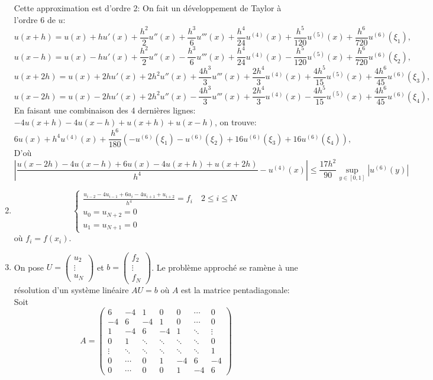 \documentclass[a4paper,11pt]{article}
\begin{document}
\begin{enumerate}
Cette approximation est  d'ordre 2: On fait un développement de Taylor à l'ordre 6 de $u$:
\[u(x+h)=u(x)+h u'(x)+\frac{h^2}2 u''(x)+\frac{h^3}6 u'''(x)+\frac{h^4}{24} u^{(4)}(x) +\frac{h^5}{120} u^{(5)}(x) +\frac{h^6}{720} u^{(6)}(\xi_1)  ,\]
\[u(x-h)=u(x)-h u'(x)+\frac{h^2}2 u''(x)-\frac{h^3}6 u'''(x)+\frac{h^4}{24} u^{(4)}(x) -\frac{h^5}{120} u^{(5)}(x) +\frac{h^6}{720} u^{(6)}(\xi_2)  ,\]
\[u(x+2h)=u(x)+2h u'(x)+2h^2 u''(x)+\frac{4h^3}3 u'''(x)+\frac{2h^4}{3} u^{(4)}(x) +\frac{4h^5}{15} u^{(5)}(x) +\frac{4h^6}{45} u^{(6)}(\xi_3)  ,\]
\[u(x-2h)=u(x)-2h u'(x)+2h^2 u''(x)-\frac{4h^3}3 u'''(x)+\frac{2h^4}{3} u^{(4)}(x) -\frac{4h^5}{15} u^{(5)}(x) +\frac{4h^6}{45} u^{(6)}(\xi_4)  ,\]
En faisant une combinaison des 4 dernières lignes: $-4u(x+h)-4u(x-h)+u(x+h)+u(x-h)$, on trouve:
\[6u(x)+h^4 u^{(4)}(x)+\frac{h^6}{180} \left(-u^{(6)}(\xi_1) - u^{(6)}(\xi_2)+16u^{(6)}(\xi_3) + 16u^{(6)}(\xi_4)\right) ,\]
D'où
\[\left| \frac{u(x-2h)-4u(x-h)+6u(x)-4u(x+h)+u(x+2h)}{h^4}- u^{(4)}(x) \right|\leq \frac{17h^2}{90}\sup_{y\in[0,1]} |u^{(6)}(y)| \]
\item 
\[\left\{\begin{array}{l}
\frac{u_{i-2}-4u_{i-1}+6u_i-4u_{i+1}+u_{i+2}}{h^4}=f_i \quad 2\leq i\leq N\\
u_0=u_{N+2}=0\\
u_1=u_{N+1}=0
\end{array}\right.
\]
où  $f_i=f(x_i)$.
\item On pose $U=\left(\begin{array}{c}  u_2 \\ \vdots \\ u_N \end{array}\right)$ et $b=\left(\begin{array}{c} f_2 \\ \vdots \\ f_N \end{array}\right)$. Le problème approché se ramène à une résolution d'un système linéaire $A U = b$ où $A$ est la matrice pentadiagonale:
Soit \[A=
\left(\begin{array}{ccccccc}
6&-4&1&0&0&\cdots&0\\
-4&6&-4&1&0&\cdots&0\\
1&-4&6&-4&1& \ddots  &\vdots\\
0& 1 &\ddots &\ddots &\ddots&\ddots&0 \\
\vdots &  \ddots &\ddots &\ddots &\ddots&\ddots&1\\
0 &\cdots &0&1 &-4&6&-4\\
   0&\cdots&0  &0&1&-4  &6
\end{array}\right)
\] 
\end{enumerate}
\end{document}
